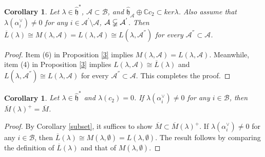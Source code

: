 \documentclass[11pt]{amsproc}
\newtheorem{corollary}[theorem]{Corollary}
\theoremstyle{definition}
\theoremstyle{remark}
\numberwithin{equation}{section} \errorcontextlines=0
\begin{document}
\begin{corollary}
Let $\lambda\in\hat{\mathfrak h}^{\ast}$, $\mathcal {A}\subset \mathcal
{B}$, and  $\hat{\mathfrak h}_{\mathcal {A}}\oplus\mathbb{C}c_2\subset
ker\lambda$. Also assume that $\lambda(\alpha_i^{\vee})\neq 0$ for
any $i\in \mathcal {A}^{'}\setminus \mathcal {A}$, $\mathcal
{A}\varsubsetneqq \mathcal {A}^{'}$. Then
$\overline{L}(\lambda)\cong M(\lambda,\mathcal
{A})=L(\lambda,\mathcal {A})\cong
 L(\lambda,\mathcal {A}^{''})$ for every $\mathcal {A}^{''}\subset\mathcal {A}$.
\end{corollary}

\begin{proof} Item (6) in Proposition \ref{3} implies $ M(\lambda,\mathcal
{A})=L(\lambda,\mathcal {A})$. Meanwhile, item (4) in Proposition
\ref{3} implies $L(\lambda,\mathcal {A})\cong \overline{L}(\lambda)$
and $L(\lambda,\mathcal {A}^{''})\cong L(\lambda,\mathcal {A})$ for
every $\mathcal {A}^{''}\subset\mathcal {A}$. This completes the
proof.
\end{proof}

\begin{corollary}\label{4}
Let $\lambda\in\hat{\mathfrak h}^{\ast}$ and $\lambda(c_2)=0$. If
$\lambda(\alpha_i^{\vee})\neq 0$ for any $i\in \mathcal {B}$, then
$\overline{M}(\lambda)^{+}=\overline{M}$.
\end{corollary}

\begin{proof}
By Corollary \ref{subset}, it suffices to
show $\overline{M}\subset\overline{M}(\lambda)^{+}$. If
$\lambda(\alpha_i^{\vee})\neq 0$ for any $i\in \mathcal {B}$, then
$\overline{L}(\lambda)\cong
M(\lambda,\emptyset)=L(\lambda,\emptyset)$. The result follows by
comparing the definition of $\overline{L}(\lambda)$ and that of
$M(\lambda,\emptyset)$. \end{proof}
\end{document}

